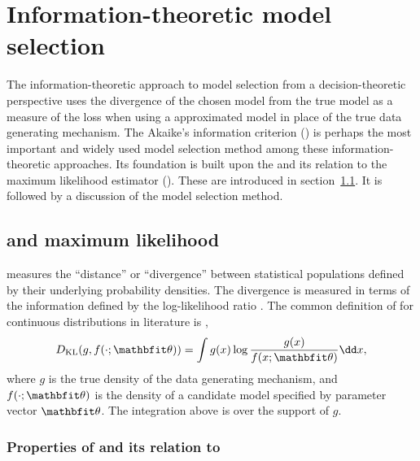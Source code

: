 \chapter{Information-theoretic model selection}
\label{cha:Information-theoretic model selection}

The information-theoretic approach to model selection from a
decision-theoretic perspective uses the divergence of the chosen model from
the true model as a measure of the loss when using a approximated model in
place of the true data generating mechanism. The Akaike's information
criterion (\aic) is perhaps the most important and widely used model selection
method among these information-theoretic approaches. Its foundation is built
upon the \kl and its relation to the maximum likelihood estimator (\mle).
These are introduced in section~\ref{sec:kl and maximum likelihood}. It is
followed by a discussion of the \aic model selection method.

\section{\kl and maximum likelihood}
\label{sec:kl and maximum likelihood}

\kl measures the ``distance'' or ``divergence'' between statistical
populations defined by their underlying probability densities. The divergence
is measured in terms of the information defined by the log-likelihood ratio
\parencite{Kullback1951}. The common definition of \kl for continuous
distributions in literature is \parencite[see][]{Claeskens2008},
\begin{equation}
  \dkl(g, f(\cdot;\bth)) = \int g(x)\log\frac{g(x)}{f(x;\bth)}\dd x,
  \label{eq:kld}
\end{equation}
where $g$ is the true density of the data generating mechanism, and
$f(\cdot;\bth)$ is the density of a candidate model specified by parameter
vector $\bth$. The integration above is over the support of $g$.

\subsection{Properties of \kl and its relation to \protect\mle}
\label{sub:Properties of kl and its relation to mle}

